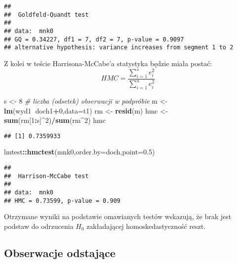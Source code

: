 \documentclass[polish,]{book}
\newenvironment{Shaded}{\begin{snugshade}}{\end{snugshade}}
\newcommand{\CommentTok}[1]{\textcolor[rgb]{0.56,0.35,0.01}{\textit{#1}}}
\newcommand{\DataTypeTok}[1]{\textcolor[rgb]{0.13,0.29,0.53}{#1}}
\newcommand{\DecValTok}[1]{\textcolor[rgb]{0.00,0.00,0.81}{#1}}
\newcommand{\FloatTok}[1]{\textcolor[rgb]{0.00,0.00,0.81}{#1}}
\newcommand{\KeywordTok}[1]{\textcolor[rgb]{0.13,0.29,0.53}{\textbf{#1}}}
\newcommand{\NormalTok}[1]{#1}
\newcommand{\OperatorTok}[1]{\textcolor[rgb]{0.81,0.36,0.00}{\textbf{#1}}}
\newcommand{\StringTok}[1]{\textcolor[rgb]{0.31,0.60,0.02}{#1}}
\begin{document}
\begin{verbatim}
## 
##  Goldfeld-Quandt test
## 
## data:  mnk0
## GQ = 0.34227, df1 = 7, df2 = 7, p-value = 0.9097
## alternative hypothesis: variance increases from segment 1 to 2
\end{verbatim}

Z kolei w teście Harrisona-McCabe'a statystyka będzie miała postać:
\begin{equation}
HMC=\frac{\sum_{i=1}^{s}e_i^2}{\sum_{i=1}^{n}e_i^2}
\label{eq:wz1316}
\end{equation}

\begin{Shaded}
\begin{Highlighting}[]
\NormalTok{s <-}\StringTok{ }\DecValTok{8} \CommentTok{# liczba (odsetek) obserwacji w podpróbie}
\NormalTok{m <-}\StringTok{ }\KeywordTok{lm}\NormalTok{(wyd1}\OperatorTok{~}\NormalTok{doch1}\OperatorTok{+}\DecValTok{0}\NormalTok{,}\DataTypeTok{data=}\NormalTok{t1)}
\NormalTok{rm <-}\StringTok{ }\KeywordTok{resid}\NormalTok{(m)}
\NormalTok{hmc <-}\StringTok{ }\KeywordTok{sum}\NormalTok{(rm[}\DecValTok{1}\OperatorTok{:}\NormalTok{s]}\OperatorTok{^}\DecValTok{2}\NormalTok{)}\OperatorTok{/}\KeywordTok{sum}\NormalTok{(rm}\OperatorTok{^}\DecValTok{2}\NormalTok{)}
\NormalTok{hmc}
\end{Highlighting}
\end{Shaded}

\begin{verbatim}
## [1] 0.7359933
\end{verbatim}

\begin{Shaded}
\begin{Highlighting}[]
\NormalTok{lmtest}\OperatorTok{::}\KeywordTok{hmctest}\NormalTok{(mnk0,}\DataTypeTok{order.by=}\NormalTok{doch,}\DataTypeTok{point=}\FloatTok{0.5}\NormalTok{)}
\end{Highlighting}
\end{Shaded}

\begin{verbatim}
## 
##  Harrison-McCabe test
## 
## data:  mnk0
## HMC = 0.73599, p-value = 0.909
\end{verbatim}

Otrzymane wyniki na podstawie omawianych testów wskazują, że brak jest podstaw
do odrzucenia \(H_0\) zakładającej homoskedastyczność reszt.

\hypertarget{part_13.2.5}{%
\subsection{Obserwacje odstające}\label{part_13.2.5}}
\end{document}
